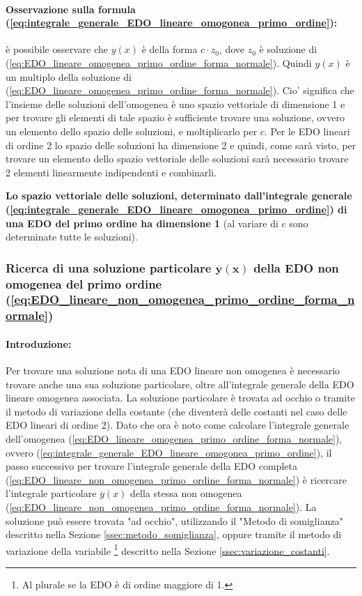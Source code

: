 \paragraph{Osservazione sulla formula (\ref{eq:integrale_generale_EDO_lineare_omogonea_primo_ordine}):} è possibile osservare che $y(x)$ è della forma $c\cdot z_0$, dove $z_0$ è soluzione di (\ref{eq:EDO_lineare_omogenea_primo_ordine_forma_normale}). Quindi $y(x)$ è un multiplo della soluzione di (\ref{eq:EDO_lineare_omogenea_primo_ordine_forma_normale}). Cio' significa che l'insieme delle soluzioni dell'omogenea è uno spazio vettoriale di dimensione 1 e per trovare gli elementi di tale spazio è sufficiente trovare una soluzione, ovvero un elemento dello spazio delle soluzioni, e moltiplicarlo per $c$. Per le EDO lineari di ordine 2 lo spazio delle soluzioni ha dimensione 2 e quindi, come sarà visto, per trovare un elemento dello spazio vettoriale delle soluzioni sarà necessario trovare 2 elementi linearmente indipendenti e combinarli.

\begin{remark}
    \textbf{Lo spazio vettoriale delle soluzioni, determinato dall'integrale generale (\ref{eq:integrale_generale_EDO_lineare_omogonea_primo_ordine}) di una EDO del primo ordine ha dimensione 1} (al variare di $c$ sono determinate tutte le soluzioni).
\end{remark}

\subsubsection{Ricerca di una soluzione particolare \texorpdfstring{$\boldsymbol{\overline{y}(x)}$}{y(x)} della EDO non omogenea del primo ordine (\ref{eq:EDO_lineare_non_omogenea_primo_ordine_forma_normale})}
\paragraph{Introduzione:} Per trovare una soluzione nota di una EDO lineare non omogenea è necessario trovare anche una sua soluzione particolare, oltre all'integrale generale della EDO lineare omogenea associata. La soluzione particolare è trovata ad occhio o tramite il metodo di variazione della costante (che diventerà delle costanti nel caso delle EDO lineari di ordine 2).
Dato che ora è noto come calcolare l'integrale generale dell'omogenea (\ref{eq:EDO_lineare_omogenea_primo_ordine_forma_normale}), ovvero (\ref{eq:integrale_generale_EDO_lineare_omogonea_primo_ordine}), il passo successivo per trovare l'integrale generale della EDO completa (\ref{eq:EDO_lineare_non_omogenea_primo_ordine_forma_normale}) è ricercare l'integrale particolare $\overline{y}(x)$ della stessa non omogenea (\ref{eq:EDO_lineare_non_omogenea_primo_ordine_forma_normale}). La soluzione può essere trovata "ad occhio", utilizzando il "Metodo di somiglianza" descritto nella Sezione \ref{ssec:metodo_somiglianza}, oppure tramite il metodo di variazione della variabile \footnote{Al plurale se la EDO è di ordine maggiore di 1.} descritto nella Sezione \ref{ssec:variazione_costanti}.

